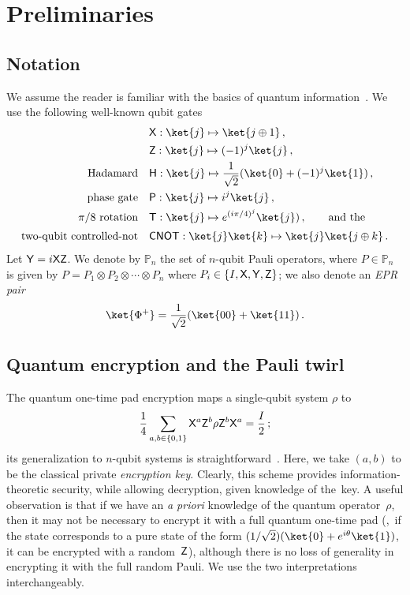 \documentclass{toc}
\newcommand{\hgate}{{\sf H}}
\newcommand{\pgate}{{\sf P}}
\newcommand{\rgate}{{\sf T}}
\newcommand{\xgate}{{\sf X}}
\newcommand{\ygate}{{\sf Y}}
\newcommand{\zgate}{{\sf Z}}
\newcommand{\cnot}{{\sf CNOT}}
\begin{document}
\section{Preliminaries}
\label{sec:prelim}
\subsection{Notation}
\label{sec:prelim-notation}

We assume the reader is familiar with the
basics of quantum information~\cite{NC00}.
%
We use the following well-known qubit gates
\begin{align}
  &\xgate: \ket{j} \mapsto \ket{j \oplus 1}\,,\\
  &\zgate: \ket{j} \mapsto (-1)^j\ket{j}\,,\\
  \text{Hadamard}\quad & \hgate: \ket{j} \mapsto \frac{1}{\sqrt{2}}(\ket{0}+ (-1)^j\ket{1})\,,\\
  \text{phase gate} \quad&  \pgate: \ket{j} \mapsto i^{j}\ket{j}\,,\\
  \text{$\pi/8$ rotation}\quad & \rgate: \ket{j} \mapsto e^{(i\pi/4)^j}\ket{j})\,,\qquad\text{and the}\\[.5ex]
  \text{two-qubit controlled-not}\quad & \cnot: \ket{j}\ket{k} \mapsto \ket{j} \ket{j\oplus k}\,.
\end{align}
Let $\ygate = i\xgate\zgate$.  We denote by $\mathbb{P}_n$ the set of
$n$-qubit Pauli operators, where $P \in \mathbb{P}_n$ is given by
$P = P_1 \otimes P_2 \otimes \cdots \otimes P_n$ where
$P_i \in \{I, \xgate, \ygate, \zgate\}$; we also denote an \emph{EPR
  pair}
\begin{equation}
  \ket{\Phi^+} = \frac{1}{\sqrt{2}}(\ket{00} + \ket{11})\,.
\end{equation}

\subsection{Quantum encryption and the Pauli twirl}
\label{sec:prelim-QOTP}
The quantum one-time pad encryption maps a single-qubit system $\rho$ to
\begin{equation}
  \frac{1}{4}\sum_{a,b \in \{0,1\}} \xgate^a \zgate^b \rho \zgate^b \xgate^a = \frac{I}{2}\,;
\end{equation}
its generalization to $n$-qubit systems is straightforward~\cite{AMTW00}.
Here, we take $(a,b)$ to be the classical private \emph{encryption key}. Clearly, this scheme provides information-theoretic security, while allowing decryption, given knowledge of the~key.
A useful observation is that if we have an \emph{a priori} knowledge of the quantum operator~$\rho$, then it may not be necessary to encrypt it with a full quantum one-time pad (\eg,~if the state corresponds to a pure state of the form $({1}/{\sqrt{2}})(\ket{0} + e^{i\theta}\ket{1})$, it can be encrypted with a random~$\zgate$), although there is no loss of generality in encrypting it with the full random Pauli. We use the two interpretations interchangeably.
\end{document}
